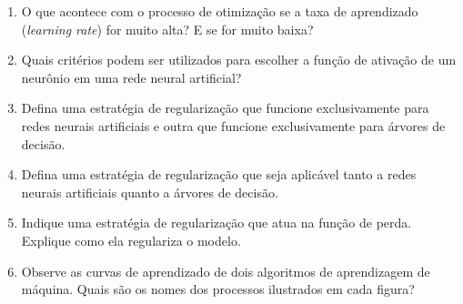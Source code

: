 \documentclass[12pt,a4paper]{article}
\begin{document}
\begin{enumerate}[leftmargin=0.55cm,itemsep=0.65em]
  \item O que acontece com o processo de otimização se a taxa de aprendizado (\textit{learning rate}) for muito alta? E se for muito baixa?

  \item Quais critérios podem ser utilizados para escolher a função de ativação de um neurônio em uma rede neural artificial?
  
  \item Defina uma estratégia de regularização que funcione exclusivamente para redes neurais artificiais e outra que funcione exclusivamente para árvores de decisão.
  
  \item Defina uma estratégia de regularização que seja aplicável tanto a redes neurais artificiais quanto a árvores de decisão.
  
  \item Indique uma estratégia de regularização que atua na função de perda. Explique como ela regulariza o modelo. 
  
  \item Observe as curvas de aprendizado de dois algoritmos de aprendizagem de máquina. Quais são os nomes dos processos ilustrados em cada figura?
  

\end{enumerate}
\end{document}
